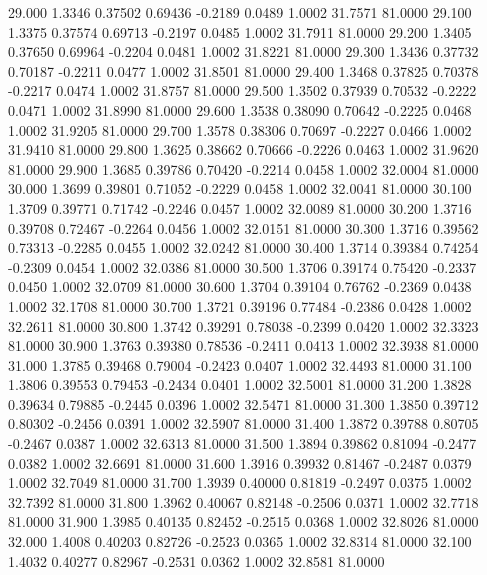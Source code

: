   29.000   1.3346   0.37502   0.69436  -0.2189   0.0489   1.0002  31.7571  81.0000
  29.100   1.3375   0.37574   0.69713  -0.2197   0.0485   1.0002  31.7911  81.0000
  29.200   1.3405   0.37650   0.69964  -0.2204   0.0481   1.0002  31.8221  81.0000
  29.300   1.3436   0.37732   0.70187  -0.2211   0.0477   1.0002  31.8501  81.0000
  29.400   1.3468   0.37825   0.70378  -0.2217   0.0474   1.0002  31.8757  81.0000
  29.500   1.3502   0.37939   0.70532  -0.2222   0.0471   1.0002  31.8990  81.0000
  29.600   1.3538   0.38090   0.70642  -0.2225   0.0468   1.0002  31.9205  81.0000
  29.700   1.3578   0.38306   0.70697  -0.2227   0.0466   1.0002  31.9410  81.0000
  29.800   1.3625   0.38662   0.70666  -0.2226   0.0463   1.0002  31.9620  81.0000
  29.900   1.3685   0.39786   0.70420  -0.2214   0.0458   1.0002  32.0004  81.0000
  30.000   1.3699   0.39801   0.71052  -0.2229   0.0458   1.0002  32.0041  81.0000
  30.100   1.3709   0.39771   0.71742  -0.2246   0.0457   1.0002  32.0089  81.0000
  30.200   1.3716   0.39708   0.72467  -0.2264   0.0456   1.0002  32.0151  81.0000
  30.300   1.3716   0.39562   0.73313  -0.2285   0.0455   1.0002  32.0242  81.0000
  30.400   1.3714   0.39384   0.74254  -0.2309   0.0454   1.0002  32.0386  81.0000
  30.500   1.3706   0.39174   0.75420  -0.2337   0.0450   1.0002  32.0709  81.0000
  30.600   1.3704   0.39104   0.76762  -0.2369   0.0438   1.0002  32.1708  81.0000
  30.700   1.3721   0.39196   0.77484  -0.2386   0.0428   1.0002  32.2611  81.0000
  30.800   1.3742   0.39291   0.78038  -0.2399   0.0420   1.0002  32.3323  81.0000
  30.900   1.3763   0.39380   0.78536  -0.2411   0.0413   1.0002  32.3938  81.0000
  31.000   1.3785   0.39468   0.79004  -0.2423   0.0407   1.0002  32.4493  81.0000
  31.100   1.3806   0.39553   0.79453  -0.2434   0.0401   1.0002  32.5001  81.0000
  31.200   1.3828   0.39634   0.79885  -0.2445   0.0396   1.0002  32.5471  81.0000
  31.300   1.3850   0.39712   0.80302  -0.2456   0.0391   1.0002  32.5907  81.0000
  31.400   1.3872   0.39788   0.80705  -0.2467   0.0387   1.0002  32.6313  81.0000
  31.500   1.3894   0.39862   0.81094  -0.2477   0.0382   1.0002  32.6691  81.0000
  31.600   1.3916   0.39932   0.81467  -0.2487   0.0379   1.0002  32.7049  81.0000
  31.700   1.3939   0.40000   0.81819  -0.2497   0.0375   1.0002  32.7392  81.0000
  31.800   1.3962   0.40067   0.82148  -0.2506   0.0371   1.0002  32.7718  81.0000
  31.900   1.3985   0.40135   0.82452  -0.2515   0.0368   1.0002  32.8026  81.0000
  32.000   1.4008   0.40203   0.82726  -0.2523   0.0365   1.0002  32.8314  81.0000
  32.100   1.4032   0.40277   0.82967  -0.2531   0.0362   1.0002  32.8581  81.0000

